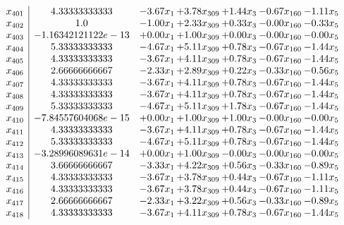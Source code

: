 \documentclass[8pt]{article}
\begin{document}
\[\begin{array}{c| c c@{\hskip 2pt} c@{\hskip 2pt} c@{\hskip 2pt} c@{\hskip 2pt} c@{\hskip 2pt} }
 x_{401}   &  4.33333333333 & -3.67 x_{1} & +  3.78 x_{309} & +  1.44 x_{3} & -0.67 x_{160} & -1.11 x_{5}\\
 x_{402}   &  1.0 & -1.00 x_{1} & +  2.33 x_{309} & +  0.33 x_{3} & -0.00 x_{160} & -0.33 x_{5}\\
 x_{403}   &  -1.16342121122e-13 & +  0.00 x_{1} & +  1.00 x_{309} & +  0.00 x_{3} & -0.00 x_{160} & -0.00 x_{5}\\
 x_{404}   &  5.33333333333 & -4.67 x_{1} & +  5.11 x_{309} & +  0.78 x_{3} & -0.67 x_{160} & -1.44 x_{5}\\
 x_{405}   &  4.33333333333 & -3.67 x_{1} & +  4.11 x_{309} & +  0.78 x_{3} & -0.67 x_{160} & -1.44 x_{5}\\
 x_{406}   &  2.66666666667 & -2.33 x_{1} & +  2.89 x_{309} & +  0.22 x_{3} & -0.33 x_{160} & -0.56 x_{5}\\
 x_{407}   &  4.33333333333 & -3.67 x_{1} & +  4.11 x_{309} & +  0.78 x_{3} & -0.67 x_{160} & -1.44 x_{5}\\
 x_{408}   &  4.33333333333 & -3.67 x_{1} & +  4.11 x_{309} & +  0.78 x_{3} & -0.67 x_{160} & -1.44 x_{5}\\
 x_{409}   &  5.33333333333 & -4.67 x_{1} & +  5.11 x_{309} & +  1.78 x_{3} & -0.67 x_{160} & -1.44 x_{5}\\
 x_{410}   &  -7.84557604068e-15 & +  0.00 x_{1} & +  1.00 x_{309} & +  1.00 x_{3} & -0.00 x_{160} & -0.00 x_{5}\\
 x_{411}   &  4.33333333333 & -3.67 x_{1} & +  4.11 x_{309} & +  0.78 x_{3} & -0.67 x_{160} & -1.44 x_{5}\\
 x_{412}   &  5.33333333333 & -4.67 x_{1} & +  5.11 x_{309} & +  0.78 x_{3} & -0.67 x_{160} & -1.44 x_{5}\\
 x_{413}   &  -3.28996089631e-14 & +  0.00 x_{1} & +  1.00 x_{309} & -0.00 x_{3} & -0.00 x_{160} & -0.00 x_{5}\\
 x_{414}   &  3.66666666667 & -3.33 x_{1} & +  4.22 x_{309} & +  0.56 x_{3} & -0.33 x_{160} & -0.89 x_{5}\\
 x_{415}   &  4.33333333333 & -3.67 x_{1} & +  3.78 x_{309} & +  0.44 x_{3} & -0.67 x_{160} & -1.11 x_{5}\\
 x_{416}   &  4.33333333333 & -3.67 x_{1} & +  3.78 x_{309} & +  0.44 x_{3} & -0.67 x_{160} & -1.11 x_{5}\\
 x_{417}   &  2.66666666667 & -2.33 x_{1} & +  3.22 x_{309} & +  0.56 x_{3} & -0.33 x_{160} & -0.89 x_{5}\\
 x_{418}   &  4.33333333333 & -3.67 x_{1} & +  4.11 x_{309} & +  0.78 x_{3} & -0.67 x_{160} & -1.44 x_{5}\\

\end{array}\]
\end{document}

